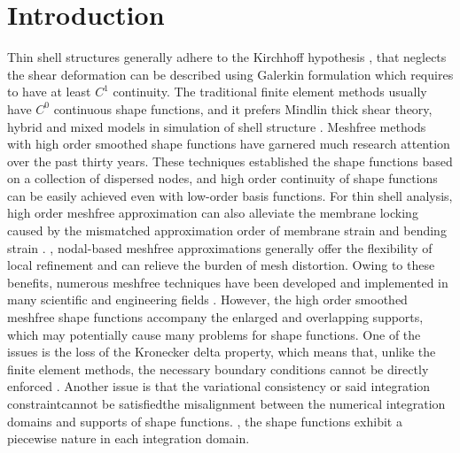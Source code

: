 \section{Introduction}\label{introduction}
Thin shell structures generally adhere to the Kirchhoff hypothesis \cite{donnell1976}, that neglects the shear deformation can be described using Galerkin formulation which requires to have at least $C^1$ continuity. 
The traditional finite element methods usually \DIFdelbegin {}\DIFdelend have $C^0$ continuous shape functions, and it prefers Mindlin thick shear theory, hybrid and mixed models in simulation of shell structure  \cite{hughes2000}. Meshfree methods \cite{belytschko1994,liu1995,chen2017} with high order smoothed shape functions have garnered much research attention over the past thirty years. These techniques established the shape functions based on a collection of dispersed nodes, and \DIFdelbegin {}\DIFdelend high order continuity of shape functions can be easily achieved even with low-order basis functions. For thin shell analysis, \DIFdelbegin {}\DIFdelend high order meshfree approximation can also \DIFaddbegin {}\DIFaddend alleviate the membrane locking caused by the mismatched approximation order of membrane strain and bending strain \cite{krysl1996}. \DIFdelbegin {}\DIFdelend \DIFaddbegin {}\DIFaddend , nodal-based meshfree approximations generally offer the flexibility of local refinement and can relieve the burden of mesh distortion. Owing to these benefits, numerous meshfree techniques have been developed and implemented in many scientific and engineering fields \DIFdelbegin {}\DIFdelend \DIFaddbegin {}\DIFaddend . However, the high order smoothed meshfree shape functions accompany the enlarged and overlapping supports, which may potentially cause many problems for shape functions. One of the issues is the loss of the Kronecker delta property, which means that, unlike the finite element methods, the necessary boundary conditions cannot be directly enforced  \cite{fernandez-mendez2004}. Another issue is that the variational consistency or said integration constraint\DIFaddbegin {}\DIFaddend cannot be satisfied\DIFdelbegin {}\DIFdelend \DIFaddbegin {}\DIFaddend the misalignment between the numerical integration domains and supports of shape functions. \DIFdelbegin {}\DIFdelend \DIFaddbegin {}\DIFaddend , the shape functions exhibit a piecewise \DIFdelbegin {}\DIFdelend nature in each integration domain. \DIFaddbegin {}
